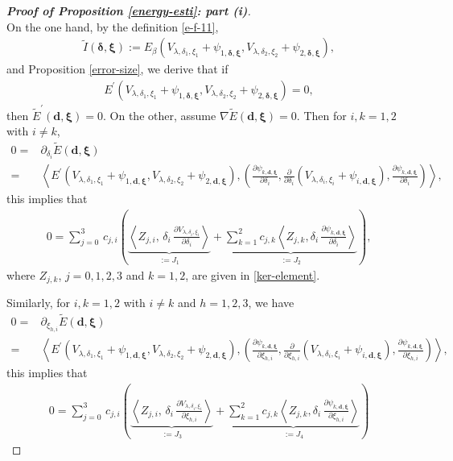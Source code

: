 \documentclass[a4paper,reqno,11pt,oneside]{amsart}
\numberwithin{equation}{section}
\begin{document}
\begin{proof}[\textbf{Proof of Proposition \eqref{energy-esti}: part (i)}]${}$\\

{  On the one hand, by the definition \eqref{e-f-11},\begin{align*}
        \widetilde{I}{(\bm{\delta},\bm{\xi})}:=E_{\beta}\left(V_{\lambda,\delta_1,\xi_1}+\psi_{1,\bm{\delta},\bm{\xi}},V_{\lambda,\delta_2,\xi_2}+\psi_{2,\bm{\delta},\bm{\xi}}\right),
    \end{align*}
and  Proposition \ref{error-size}, we derive that if
\begin{align*}
    E^{\prime}\left(V_{\lambda,\delta_1,\xi_1}+\psi_{1,\bm{\delta},\bm{\xi}},V_{\lambda,\delta_2,\xi_2}+\psi_{2,\bm{\delta},\bm{\xi}}\right)=0,
\end{align*}
then $\widetilde{E}^{\prime}{(\bm{d},\bm{\xi})}=0.$ On the other, assume}  $\nabla \widetilde{E} {(\bm{d},\bm{\xi})}=0.$
Then for $i,k=1,2$ with $i\neq k$, 
\begin{align*}
    0=&\partial_{\delta_{i}}\widetilde{E}{(\bm{d},\bm{\xi})}\\=&\left\langle E^{\prime}\left(V_{\lambda,\delta_1,\xi_1}+\psi_{1,\bm{d},\bm{\xi}},V_{\lambda,\delta_2,\xi_2}+\psi_{2,\bm{d},\bm{\xi}}\right),{ \left(\frac{\partial \psi_{k,\bm{d},\bm{\xi}}}{\partial\delta_i},\frac{\partial}{\partial\delta_i}\left(V_{\lambda,\delta_i,\xi_i}+\psi_{i,\bm{d},\bm{\xi}}\right),\frac{\partial \psi_{k,\bm{d},\bm{\xi}}}{\partial\delta_i}\right)}\right\rangle,
\end{align*}
this implies that 
\begin{align}\label{first-0}
0=\sum_{j=0}^{3}\,c_{j,i}\left(\underbrace{\left\langle Z_{j,i},\,\delta_i\,\frac{\partial V_{\lambda,\delta_i,\xi_i}}{\partial\delta_i}\right\rangle}_{:=J_1}+\underbrace{\sum_{k=1}^2c_{j,k}\left\langle Z_{j,k},\delta_i\,\frac{\partial\psi_{k,\bm{d},\bm{\xi}}}{\partial\delta_i}\right\rangle}_{:=J_2}\right),
\end{align}
where $Z_{j,k}$, $j=0,1,2,3$ and $k=1,2$, are given in \eqref{ker-element}. 

Similarly, for $i,k=1,2$ with $i\neq k$ and $h=1,2,3$, we have
 \begin{align*}
    0=&\partial_{\xi_{h,i}}\widetilde{E}{(\bm{d},\bm{\xi})}\\=&\left\langle E^{\prime}\left(V_{\lambda,\delta_1,\xi_1}+\psi_{1,\bm{d},\bm{\xi}},V_{\lambda,\delta_2,\xi_2}+\psi_{2,\bm{d},\bm{\xi}}\right),{ \left(\frac{\partial \psi_{k,\bm{d},\bm{\xi}}}{\partial\xi_{h,i}},\frac{\partial}{\partial\xi_{h,i}}\left(V_{\lambda,\delta_i,\xi_i}+\psi_{i,\bm{d},\bm{\xi}}\right),\frac{\partial \psi_{k,\bm{d},\bm{\xi}}}{\partial\xi_{h,i}}\right)}\right\rangle,
\end{align*}
this implies that 
\begin{align}\label{first-h}
0=\sum_{j=0}^{3}\,c_{j,i}\left(\underbrace{\left\langle Z_{j,i},\,\delta_i\,\frac{\partial V_{\lambda,\delta_i,\xi_i}}{\partial\xi_{h,i}}\right\rangle}_{:=J_3}+\underbrace{\sum_{k=1}^2c_{j,k}\left\langle Z_{j,k},\delta_i\,\frac{\partial\psi_{k,\bm{d},\bm{\xi}}}{\partial\xi_{h,i}}\right\rangle}_{:=J_4}\right)
\end{align}


\end{proof}
\end{document}
